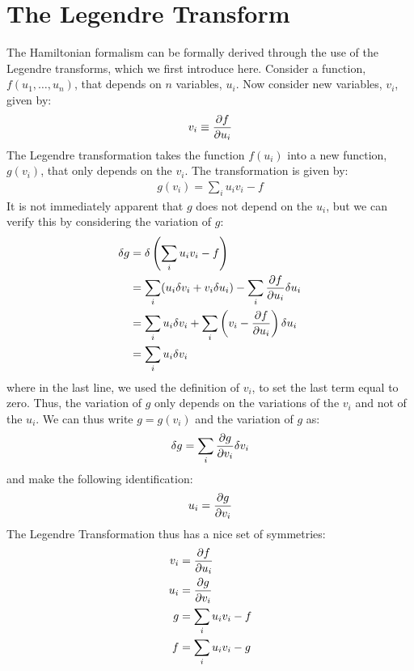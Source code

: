 \section{The Legendre Transform}
The Hamiltonian formalism can be formally derived through the use of the Legendre transforms, which we first introduce here. Consider a function, $f(u_1,\dots ,u_n)$, that depends on $n$ variables, $u_i$. Now consider new variables, $v_i$, given by:
\begin{align}
v_i \equiv \frac{\partial f}{\partial u_i} 
\end{align}
The Legendre transformation takes the function $f(u_i)$ into a new function, $g(v_i)$, that only depends on the $v_i$. The transformation is given by:
\begin{align}
g(v_i)=\sum_i u_iv_i-f
\end{align}
It is not immediately apparent that $g$ does not depend on the $u_i$, but we can verify this by considering the variation of $g$:
\begin{align}
\delta g &= \delta \left(\sum_i u_iv_i-f\right)\nonumber\\
&=\sum_i (u_i\delta v_i+v_i\delta u_i)-\sum_i \frac{\partial f}{\partial u_i}\delta u_i\nonumber\\
&=\sum_i u_i\delta v_i + \sum_i\left(v_i-\frac{\partial f}{\partial u_i} \right)\delta u_i\nonumber\\
&=\sum_i u_i\delta v_i
\end{align}
where in the last line, we used the definition of $v_i$, to set the last term equal to zero. Thus, the variation of $g$ only depends on the variations of the $v_i$ and not of the $u_i$. We can thus write $g=g(v_i)$ and the variation of $g$ as:
\begin{align}
\delta g = \sum_i \frac{\partial g}{\partial v_i}\delta v_i
\end{align}
and make the following identification:
\begin{align}
u_i = \frac{\partial g}{\partial v_i}
\end{align}
The Legendre Transformation thus has a nice set of symmetries:
\begin{align}
v_i&=\frac{\partial f}{\partial u_i}\nonumber\\
u_i&=\frac{\partial g}{\partial v_i}\nonumber\\
g&=\sum_i u_iv_i-f\nonumber\\
f&=\sum_i u_iv_i-g
\end{align}

